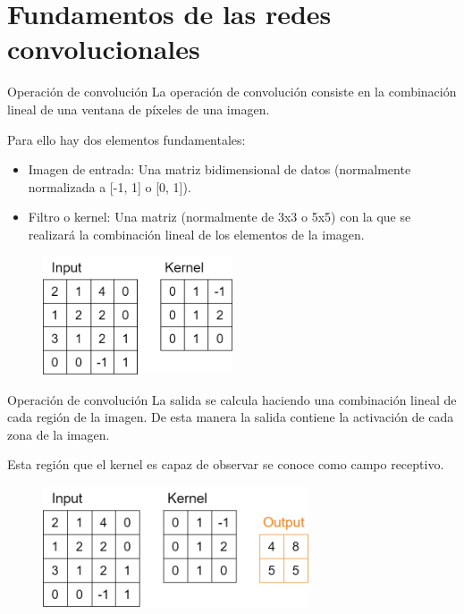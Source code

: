 \section{Fundamentos de las redes convolucionales}

\begin{frame}{Operación de convolución}
La operación de \alert{convolución} consiste en la \alert{combinación lineal} de una ventana de píxeles de una imagen.

Para ello hay dos elementos fundamentales:
\begin{itemize}
    \item \alert{Imagen de entrada}: Una matriz \alert{bidimensional} de datos (normalmente normalizada a \alert{[-1, 1]} o \alert{[0, 1]}).
    \item \alert{Filtro o kernel}: Una matriz (normalmente de 3x3 o 5x5) con la que se realizará la \alert{combinación lineal} de los elementos de la imagen.
\end{itemize}

\begin{figure}
    \centering
    \includegraphics[width=0.5\textwidth]{figures/Tema 3/Convolucion2D_1.png}
\end{figure}
\end{frame}

\begin{frame}{Operación de convolución}
La salida se calcula  haciendo una \alert{combinación lineal} de cada región de la imagen. De esta manera la salida contiene la activación de cada zona de la imagen.

Esta región que el \alert{kernel} es capaz de \alert{observar} se conoce como \alert{campo receptivo}.

\begin{figure}
    \centering
    \includegraphics[width=0.7\textwidth]{figures/Tema 3/Convolucion2D_2.png}
\end{figure}
\end{frame}


